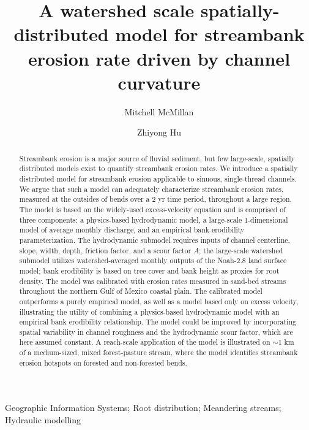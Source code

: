 \documentclass[preprint, review, authoryear, 12pt]{elsarticle}
\begin{document}
\begin{frontmatter}

\title{A watershed scale spatially-distributed model for streambank erosion rate driven by channel curvature}

\author{Mitchell McMillan}

\author{Zhiyong Hu}
\address{The University of West Florida, Department of Earth and Environmental Sciences, Pensacola, FL}


\begin{abstract}
Streambank erosion is a major source of fluvial sediment, but few large-scale, spatially distributed models exist to quantify streambank erosion rates. We introduce a spatially distributed model for streambank erosion applicable to sinuous, single-thread channels. We argue that such a model can adequately characterize streambank erosion rates, measured at the outsides of bends over a 2 yr time period, throughout a large region. The model is based on the widely-used excess-velocity equation and is comprised of three components: a physics-based hydrodynamic model, a large-scale 1-dimensional model of average monthly discharge, and an empirical bank erodibility parameterization. The hydrodynamic submodel requires inputs of channel centerline, slope, width, depth, friction factor, and a scour factor $A$; the large-scale watershed submodel utilizes watershed-averaged monthly outputs of the Noah-2.8 land surface model; bank erodibility is based on tree cover and bank height as proxies for root density. The model was calibrated with erosion rates measured in sand-bed streams throughout the northern Gulf of Mexico coastal plain. The calibrated model outperforms a purely empirical model, as well as a model based only on excess velocity, illustrating the utility of combining a physics-based hydrodynamic model with an empirical bank erodibility relationship. The model could be improved by incorporating spatial variability in channel roughness and the hydrodynamic scour factor, which are here assumed constant. A reach-scale application of the model is illustrated on $\sim$1 km of a medium-sized, mixed forest-pasture stream, where the model identifies streambank erosion hotspots on forested and non-forested bends.
\end{abstract}

\begin{keyword}
Geographic Information Systems; Root distribution; Meandering streams; Hydraulic modelling
\end{keyword}

\end{frontmatter}
\end{document}
